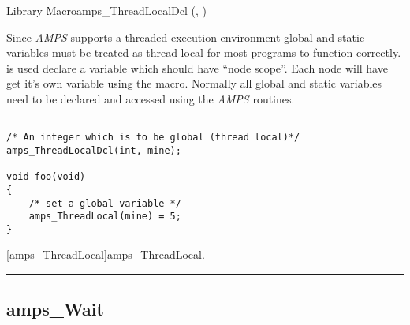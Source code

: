 \begin{deftypefn}{Library Macro}{}{amps\_ThreadLocalDcl}
(, )

\DESCRIPTION

Since {\em AMPS} supports a threaded execution environment global and
static variables must be treated as thread local for most programs to
function correctly.   is used declare a
variable which should have ``node scope''.  Each node will have get
it's own variable using the  macro.
Normally all global and static variables need to be declared and
accessed using the {\em AMPS} routines.

\EXAMPLE

\begin{display}\begin{verbatim}

/* An integer which is to be global (thread local)*/
amps_ThreadLocalDcl(int, mine);

void foo(void)
{
	/* set a global variable */
	amps_ThreadLocal(mine) = 5;
}

\end{verbatim}\end{display}

\SEEALSO
\vref{amps_ThreadLocal}{amps\_ThreadLocal}. \\

\end{deftypefn}


\noindent\rule{\textwidth}{1mm}

\subsection{amps\_Wait}
\label{amps_Wait}


